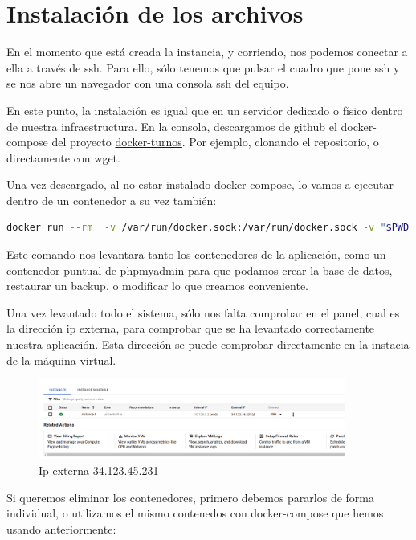 \documentclass[11pt,spanish,listoffigures,listoftables]{tfgetsinf}
\begin{document}
\section{Instalación de los archivos}

En el momento que está creada la instancia, y corriendo, nos podemos conectar a ella a través de ssh. Para ello, sólo tenemos que pulsar el cuadro que pone ssh y se nos abre un navegador con una consola ssh del equipo.

En este punto, la instalación es igual que en un servidor dedicado o físico dentro de nuestra infraestructura. En la consola, descargamos de github el docker-compose del proyecto \href{https://github.com/jrinconm/docker-turnos/}{docker-turnos}.
Por ejemplo, clonando el repositorio, o directamente con wget. 

Una vez descargado, al no estar instalado docker-compose, lo vamos a ejecutar dentro de un contenedor a su vez también:

\begin{lstlisting}[language=bash, caption={Comando docker para lanzar docker-compose}]
docker run --rm  -v /var/run/docker.sock:/var/run/docker.sock -v "$PWD:$PWD"   -w="$PWD"  docker/compose:1.24.0 up \d
\end{lstlisting}
Este comando nos levantara tanto los contenedores de la aplicación, como un contenedor puntual de phpmyadmin para que podamos crear la base de datos, restaurar un backup, o modificar lo que creamos conveniente.

Una vez levantado todo el sistema, sólo nos falta comprobar en el panel, cual es la dirección ip externa, para comprobar que se ha levantado correctamente nuestra aplicación. Esta dirección se puede comprobar directamente en la instacia de la máquina virtual.
\begin{figure}[h!] %
  \centering
   \includegraphics[width=0.90\textwidth]{img/ipexterna.png}
   \caption{Ip externa 34.123.45.231}
   \label{fig:ipexterna}
 \end{figure}

Si queremos eliminar los contenedores, primero debemos pararlos de forma individual, o utilizamos el mismo contenedos con docker-compose que hemos usando anteriormente:
\end{document}
